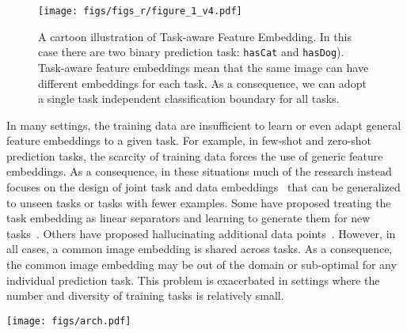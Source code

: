 \documentclass[10pt,twocolumn,letterpaper]{article}
\newcommand{\model}{TAFE-Net\xspace}
\begin{document}
\begin{figure}[t]
    \centering
    \texttt{[image: figs/figs\_r/figure\_1\_v4.pdf]} \caption{A cartoon illustration of Task-aware Feature Embedding. In this case there are two binary prediction task: \texttt{hasCat} and \texttt{hasDog}).
    Task-aware feature embeddings mean that the same image can have different embeddings for each task.
    As a consequence, we can adopt a single task independent classification boundary for all tasks.}
    \label{fig:tafe}
\end{figure}

In many settings, the training data are insufficient to learn or even adapt general feature embeddings to a given task.
For example, in few-shot and zero-shot prediction tasks, the scarcity of training data forces the use of generic feature embeddings.
As a consequence, in these situations much of the research instead focuses on the design of joint task and data embeddings~\cite{Changpinyo_2016_CVPR,frome2013devise,zhang2016zero} that can be generalized to unseen tasks or tasks with fewer examples. 
Some have proposed treating the task embedding as linear separators and learning to generate them for new tasks~\cite{vinyals2016matching,lu2016visual}. 
Others have proposed hallucinating additional data points~\cite{xian2018feature,hariharan2017low, wang2018low}. 
However, in all cases, a common image embedding is shared across tasks. 
As a consequence, the common image embedding may be out of the domain or sub-optimal for any individual prediction task. 
This problem is exacerbated in settings where the number and diversity of training tasks is relatively small.

\begin{figure*}[ht]
    \centering
    \texttt{[image: figs/arch.pdf]}
    \caption{\model architecture design. \model has
    a task-aware meta learner that generates the parameters of
    the feature layers within a prediction network for classification. The generated weights are
    factorized into task-specific weights in low dimension and 
    shared weights across all tasks.}
    \label{fig:model_arch}
\end{figure*}
\end{document}
